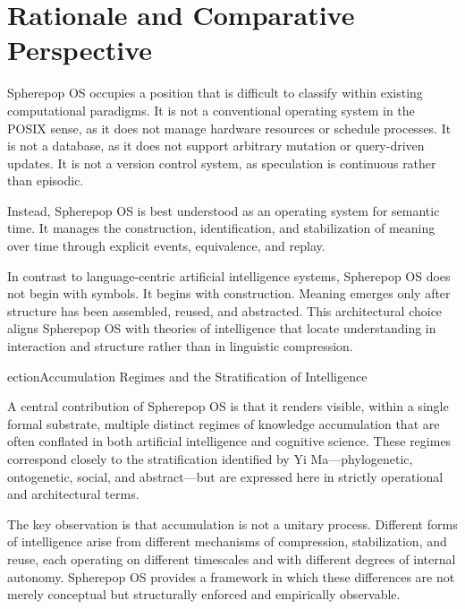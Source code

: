 \documentclass[11pt]{article}
\begin{document}
\section{Rationale and Comparative Perspective}

Spherepop OS occupies a position that is difficult to classify within
existing computational paradigms. It is not a conventional operating system
in the POSIX sense, as it does not manage hardware resources or schedule
processes. It is not a database, as it does not support arbitrary mutation
or query-driven updates. It is not a version control system, as speculation
is continuous rather than episodic.

Instead, Spherepop OS is best understood as an operating system for semantic
time. It manages the construction, identification, and stabilization of
meaning over time through explicit events, equivalence, and replay.

In contrast to language-centric artificial intelligence systems, Spherepop
OS does not begin with symbols. It begins with construction. Meaning emerges
only after structure has been assembled, reused, and abstracted. This
architectural choice aligns Spherepop OS with theories of intelligence that
locate understanding in interaction and structure rather than in linguistic
compression.



ection{Accumulation Regimes and the Stratification of Intelligence}

A central contribution of Spherepop OS is that it renders visible, within a
single formal substrate, multiple distinct regimes of knowledge
accumulation that are often conflated in both artificial intelligence and
cognitive science. These regimes correspond closely to the stratification
identified by Yi Ma—phylogenetic, ontogenetic, social, and abstract—but are
expressed here in strictly operational and architectural terms.

The key observation is that accumulation is not a unitary process. Different
forms of intelligence arise from different mechanisms of compression,
stabilization, and reuse, each operating on different timescales and with
different degrees of internal autonomy. Spherepop OS provides a framework in
which these differences are not merely conceptual but structurally enforced
and empirically observable.
\end{document}
